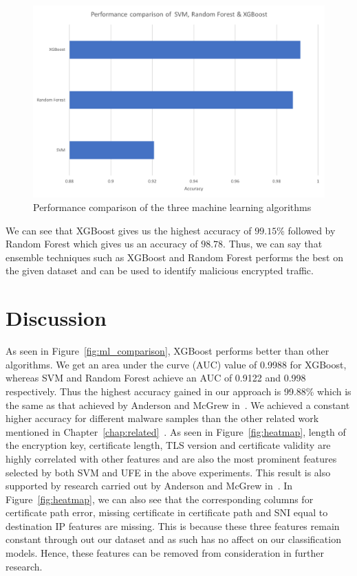 \begin{figure}[htb]
	\centering
	\includegraphics[width=1\textwidth]{images/svm_rf_xgb.png}
	\caption{Performance comparison of the three machine learning algorithms} 
	\label{fig:result_svm_rf_xgb}
\end{figure}

We can see that XGBoost gives us the highest accuracy of $99.15$\% followed by Random Forest which gives us an accuracy of $98.78$. Thus, we can say that ensemble techniques such as XGBoost and Random Forest performs the best on the given dataset and can be used to identify malicious encrypted traffic.

\pagebreak

\section{Discussion}

As seen in Figure~\ref{fig:ml_comparison}, XGBoost performs better than other algorithms. We get an area under the curve (AUC) value of 0.9988 for XGBoost, whereas SVM and Random Forest achieve an AUC of 0.9122 and 0.998 respectively. Thus the highest accuracy gained in our approach is 99.88\% which is the same as that achieved by Anderson and McGrew in~\cite{AndersonM17}. We achieved a constant higher accuracy for different malware samples than the other related work mentioned in Chapter~\ref{chap:related}~\cite{TegelerFVK12,PrasseMPHS17,LokocKCSP16}. As seen in Figure~\ref{fig:heatmap}, length of the encryption key, certificate length, TLS version and certificate validity are highly correlated with other features and are also the most prominent features selected by both SVM and UFE in the above experiments. This result is also supported by research carried out by Anderson and McGrew in~\cite{AndersonPM16}. In Figure~\ref{fig:heatmap}, we can also see that the corresponding columns for certificate path error, missing certificate in certificate path and SNI equal to destination IP features are missing. This is because these three features remain constant through out our dataset and as such has no affect on our classification models. Hence, these features can be removed from consideration in further research.

